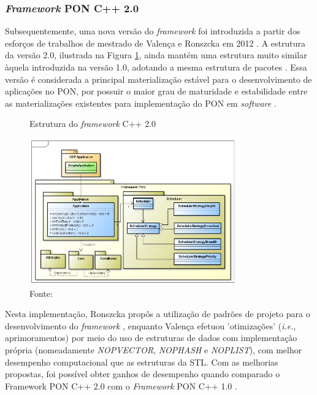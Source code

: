 \FloatBarrier

\subsubsection{\textit{Framework} PON C++ 2.0}\label{sec:fw2_revisao}

Subsequentemente, uma nova versão do \textit{framework} foi introduzida a partir
dos esforços de trabalhos de mestrado de Valença e Ronszcka em 2012
\cite{msc_valenca_2012,msc_Ronszcka_2012}. A estrutura da versão 2.0, ilustrada
na Figura \ref{fig:fw2_struct}, ainda mantém uma estrutura muito similar àquela
introduzida na versão 1.0, adotando a mesma estrutura de pacotes
\cite{msc_Ronszcka_2012}. Essa versão é considerada a principal materialização
estável para o desenvolvimento de aplicações no PON, por possuir o maior grau de
maturidade e estabilidade entre as materializações existentes para implementação
do PON em \textit{software} \cite{doc_ronszcka_2019}.

\begin{figure}[!htb]
  \centering
  \caption{Estrutura do \textit{framework} C++ 2.0}
  \includegraphics[width=0.8\textwidth]{../figures/fw2_structure.png}
  \caption*{Fonte:
    }
  \label{fig:fw2_struct}
\end{figure}

Nesta implementação, Ronszcka propôs a utilização de padrões de projeto para o
desenvolvimento do \textit{framework} \cite{msc_Ronszcka_2012}, enquanto Valença
efetuou 'otimizações' (\textit{i.e.}, aprimoramentos) por meio do uso de
estruturas de dados com implementação própria (nomeadamente \textit{NOPVECTOR},
\textit{NOPHASH} e \textit{NOPLIST}), com melhor desempenho computacional que as
estruturas da STL. Com as melhorias propostas, foi possível obter ganhos de
desempenho quando comparado o Framework PON C++ 2.0 com o \textit{Framework} PON
C++ 1.0 \cite{msc_valenca_2012}. 

